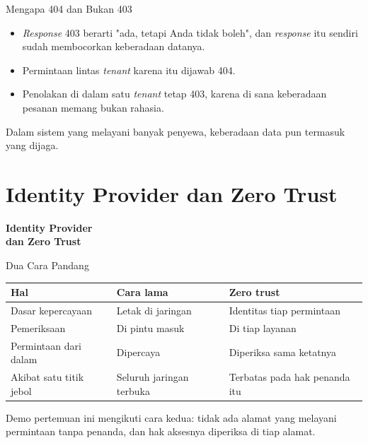 \documentclass[aspectratio=169, table, 12pt]{beamer}
\begin{document}
\begin{frame}{{\Large Mengapa 404 dan Bukan 403}}
  \vspace{14pt}
  \begin{itemize}
    \item \textit{Response} 403 berarti "ada, tetapi Anda tidak boleh", dan \textit{response} itu
          sendiri sudah membocorkan keberadaan datanya.
    \item Permintaan lintas \textit{tenant} karena itu dijawab 404.
    \item Penolakan di dalam satu \textit{tenant} tetap 403, karena di sana
          keberadaan pesanan memang bukan rahasia.
  \end{itemize}
  \vspace{10pt}
  {\small Dalam sistem yang melayani banyak penyewa, keberadaan data pun
  termasuk yang dijaga.}
\end{frame}

\section{Identity Provider dan Zero Trust}

\begin{frame}{\hfill}
  \centering
  \Huge{\textbf{Identity Provider\\dan Zero Trust}}
\end{frame}

\begin{frame}{{\Large Dua Cara Pandang}}
  \vspace{6pt}
  \centering
  {\footnotesize
  \begin{tabularx}{\textwidth}{lYY}
    \hline
    \textbf{Hal} & \textbf{Cara lama} & \textbf{Zero trust} \\
    \hline
    Dasar kepercayaan & Letak di jaringan & Identitas tiap permintaan \\
    \hline
    Pemeriksaan & Di pintu masuk & Di tiap layanan \\
    \hline
    Permintaan dari dalam & Dipercaya & Diperiksa sama ketatnya \\
    \hline
    Akibat satu titik jebol & Seluruh jaringan terbuka & Terbatas pada hak penanda itu \\
    \hline
  \end{tabularx}}

  \vspace{8pt}
  {\small Demo pertemuan ini mengikuti cara kedua: tidak ada alamat yang
  melayani permintaan tanpa penanda, dan hak aksesnya diperiksa di tiap
  alamat.}
\end{frame}
\end{document}
